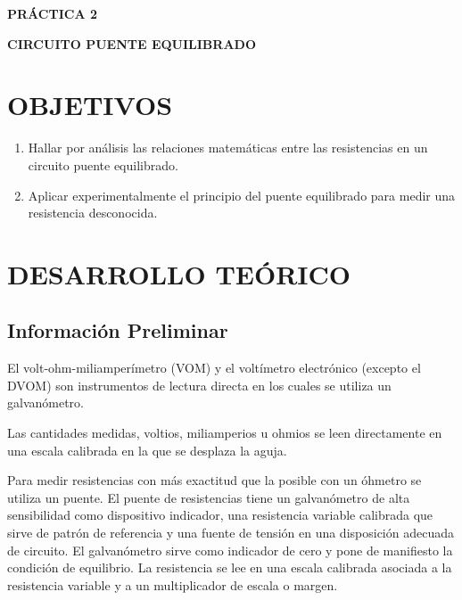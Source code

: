 \documentclass{article}
\numberwithin{equation}{subsection}
\numberwithin{figure}{section}
\numberwithin{table}{section}
\begin{document}
\begin{center}
    \large\textbf{PRÁCTICA 2}
    \vspace{0.5cm}
    
    \huge\textbf{CIRCUITO PUENTE EQUILIBRADO}
\end{center}

\tableofcontents
\newpage

\section{OBJETIVOS}
\begin{enumerate}
    \item Hallar por análisis las relaciones matemáticas entre las resistencias en un circuito puente equilibrado.
    \item Aplicar experimentalmente el principio del puente equilibrado para medir una resistencia desconocida.
\end{enumerate}

\section{DESARROLLO TEÓRICO}

\subsection{Información Preliminar}

El volt-ohm-miliamperímetro (VOM) y el voltímetro electrónico (excepto el DVOM) son instrumentos de lectura directa 
en los cuales se utiliza un galvanómetro.

Las cantidades medidas, voltios, miliamperios u ohmios se leen directamente en una escala calibrada en la que se 
desplaza la aguja.

Para medir resistencias con más exactitud que la posible con un óhmetro se utiliza un puente. El puente de 
resistencias tiene un galvanómetro de alta sensibilidad como dispositivo indicador, una resistencia variable 
calibrada que sirve de patrón de referencia y una fuente de tensión en una disposición adecuada de circuito. 
El galvanómetro sirve como indicador de cero y pone de manifiesto la condición de equilibrio. La resistencia 
se lee en una escala calibrada asociada a la resistencia variable y a un multiplicador de escala o margen.
\end{document}
